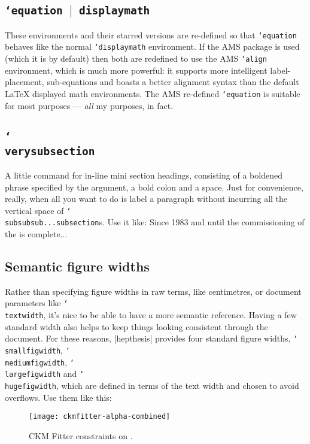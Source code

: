 \documentclass[12pt]{article}
\newcommand{\Or}{\ensuremath{\vert}\xspace}
\newcommand{\texcmd}[1]{\texttt{\char`\\#1}}
\newcommand{\texenv}[1]{\texttt{\char`#1}}
\newenvironment{snippet}{\Verbatim}{\endVerbatim}
\begin{document}
\subsection{\texenv{equation \Or displaymath}}
These environments and their starred versions are re-defined so that
\texenv{equation} behaves like the normal \texenv{displaymath} environment. If
the AMS package is used (which it is by default) then both are redefined to use
the AMS \texenv{align} environment, which is much more powerful: it supports
more intelligent label-placement, sub-equations and boasts a better alignment
syntax than the default \LaTeX{} displayed math environments. The AMS re-defined
\texenv{equation} is suitable for most purposes --- \emph{all} my purposes, in
fact.

\subsection{\texcmd{verysubsection}}
A little command for in-line mini section headings, consisting of a boldened
phrase specified by the argument, a bold colon and a space. Just for
convenience, really, when all you want to do is label a paragraph without
incurring all the vertical space of \texcmd{subsubsub...subsection}s. Use it
like:
%
\begin{snippet}
Since 1983 and until the commissioning of the \LHC is complete...
\end{snippet}

\subsection{Semantic figure widths}
Rather than specifying figure widths in raw terms, like centimetres, or document
parameters like \texcmd{textwidth}, it's nice to be able to have a more semantic
reference. Having a few standard width also helps to keep things looking
consistent through the document. For these reasons, |hepthesis| provides four
standard figure widths, \texcmd{smallfigwidth}, \texcmd{mediumfigwidth},
\texcmd{largefigwidth} and \texcmd{hugefigwidth}, which are defined in terms of
the text width and chosen to avoid overflows. Use them like this:
%
\begin{snippet}
\begin{figure}
  \texttt{[image: ckmfitter-alpha-combined]}
  \caption{CKM Fitter constraints on \alphaCKM.}
  \label{fig:CKMFitter}
\end{figure}
\end{snippet}
  
\end{document}
